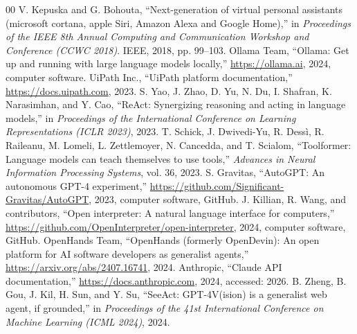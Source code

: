 \documentclass[conference]{IEEEtran}
\begin{document}
\begin{thebibliography}{00}
 V. Kepuska and G. Bohouta, ``Next-generation of virtual personal assistants (microsoft cortana, apple Siri, Amazon Alexa and Google Home),'' in \emph{Proceedings of the IEEE 8th Annual Computing and Communication Workshop and Conference (CCWC 2018)}. IEEE, 2018, pp. 99--103.
 Ollama Team, ``Ollama: Get up and running with large language models locally,'' \url{https://ollama.ai}, 2024, computer software.
 UiPath Inc., ``UiPath platform documentation,'' \url{https://docs.uipath.com}, 2023.
 S. Yao, J. Zhao, D. Yu, N. Du, I. Shafran, K. Narasimhan, and Y. Cao, ``ReAct: Synergizing reasoning and acting in language models,'' in \emph{Proceedings of the International Conference on Learning Representations (ICLR 2023)}, 2023.
 T. Schick, J. Dwivedi-Yu, R. Dess\`i, R. Raileanu, M. Lomeli, L. Zettlemoyer, N. Cancedda, and T. Scialom, ``Toolformer: Language models can teach themselves to use tools,'' \emph{Advances in Neural Information Processing Systems}, vol. 36, 2023.
 S. Gravitas, ``AutoGPT: An autonomous GPT-4 experiment,'' \url{https://github.com/Significant-Gravitas/AutoGPT}, 2023, computer software, GitHub.
 J. Killian, R. Wang, and contributors, ``Open interpreter: A natural language interface for computers,'' \url{https://github.com/OpenInterpreter/open-interpreter}, 2024, computer software, GitHub.
 OpenHands Team, ``OpenHands (formerly OpenDevin): An open platform for AI software developers as generalist agents,'' \url{https://arxiv.org/abs/2407.16741}, 2024.
 Anthropic, ``Claude API documentation,'' \url{https://docs.anthropic.com}, 2024, accessed: 2026.
 B. Zheng, B. Gou, J. Kil, H. Sun, and Y. Su, ``SeeAct: GPT-4V(ision) is a generalist web agent, if grounded,'' in \emph{Proceedings of the 41st International Conference on Machine Learning (ICML 2024)}, 2024.
\end{thebibliography}
\end{document}
